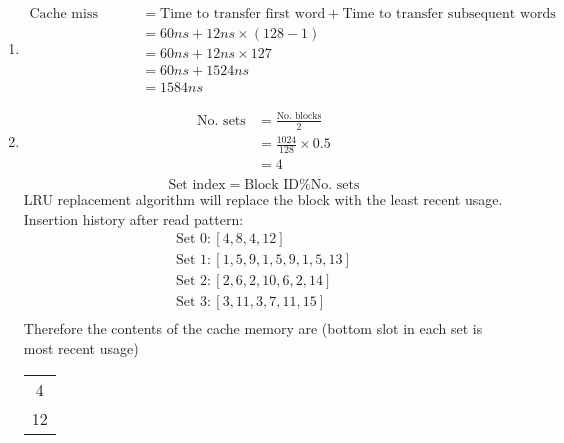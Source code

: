 \documentclass{article}
\begin{document}
\begin{enumerate}[label=(\alph*)]
    \item \begin{align*}
              \text{Cache miss penalty} & = \text{Time to transfer first word} + \text{Time to transfer subsequent words} \\
                                        & = 60ns + 12ns \times (128 - 1)                                                  \\
                                        & = 60ns + 12ns \times 127                                                        \\
                                        & = 60ns + 1524ns                                                                 \\
                                        & = 1584ns
          \end{align*}
    \item \begin{align*}
              \text{No. sets} & = \frac{\text{No. blocks} }2  \\
                              & = \frac{1024}{128} \times 0.5 \\
                              & = 4                           \\
          \end{align*}
          \[
              \text{Set index} = \text{Block ID} \% \text{No. sets}
          \]
          LRU replacement algorithm will replace the block with the least recent usage. Insertion history after read pattern:
          \begin{align*}
              \text{Set } 0 : [4,8,4,12]           \\
              \text{Set } 1 : [1,5,9,1,5,9,1,5,13] \\
              \text{Set } 2 : [2,6,2,10,6,2,14]    \\
              \text{Set } 3 : [3,11,3,7,11,15]     \\
          \end{align*}
          Therefore the contents of the cache memory are (bottom slot in each set is most recent usage)
          \begin{table}[h]
              \centering
              \begin{tabular}{|c|}
                  \hline
                  4  \\
                  12 \\
                  \hline

\end{tabular}
\end{table}
\end{enumerate}
\end{document}
